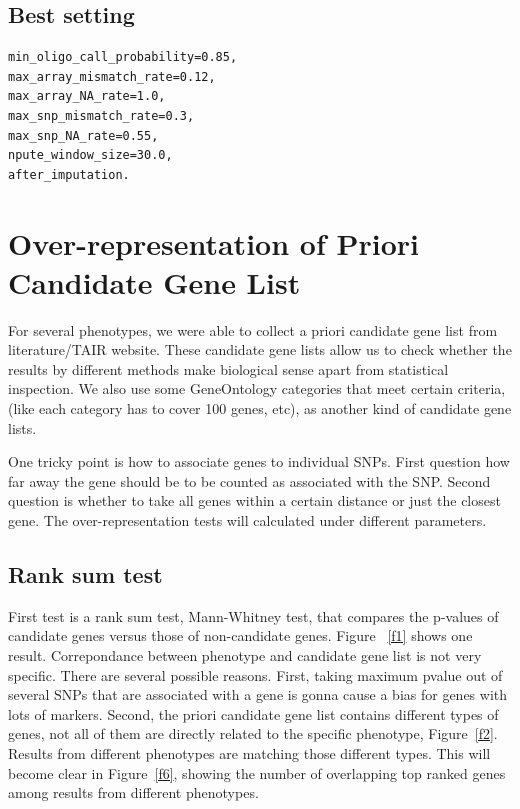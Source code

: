 \documentclass[a4paper,10pt]{article}
\begin{document}
\subsection{Best setting}
\begin{verbatim}
min_oligo_call_probability=0.85,
max_array_mismatch_rate=0.12,
max_array_NA_rate=1.0,
max_snp_mismatch_rate=0.3,
max_snp_NA_rate=0.55,
npute_window_size=30.0,
after_imputation.
\end{verbatim}


\section{Over-representation of Priori Candidate Gene List}
For several phenotypes, we were able to collect a priori candidate gene list from literature/TAIR website. These candidate gene lists allow us to check whether the results by different methods make biological sense apart from statistical inspection. We also use some GeneOntology categories that meet certain criteria, (like each category has to cover 100 genes, etc), as another kind of candidate gene lists.

One tricky point is how to associate genes to individual SNPs. First question how far away the gene should be to be counted as associated with the SNP. Second question is whether to take all genes within a certain distance or just the closest gene. The over-representation tests will calculated under different parameters.

\subsection{Rank sum test}

First test is a rank sum test, Mann-Whitney test, that compares the p-values of candidate genes versus those of non-candidate genes. Figure ~\ref{f1} shows one result. Correpondance between phenotype and candidate gene list is not very specific. There are several possible reasons. First, taking maximum pvalue out of several SNPs that are associated with a gene is gonna cause a bias for genes with lots of markers. Second, the priori candidate gene list contains different types of genes, not all of them are directly related to the specific phenotype, Figure~\ref{f2}. Results from different phenotypes are matching those different types. This will become clear in Figure~\ref{f6}, showing the number of overlapping top ranked genes among results from different phenotypes.
\end{document}
